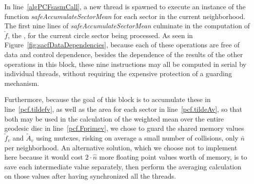 In line~\ref{algPCFsasmCall}, a new thread is spawned to execute an instance of the function \textit{safeAccumulateSectorMean} for each sector in the current neighborhood. The first nine lines of \textit{safeAccumulateSectorMean} culminate in the computation of $\check{f}$, the \wmfv{}, for the current circle sector being processed. As seen in Figure~\ref{fig:sacfDataDependencies}, because each of these operations are free of data and control dependence, besides the dependence of the results of the other operations in this block, these nine instructions may all be computed in serial by individual threads, without requiring the expensive protection of a guarding mechanism.

Furthermore, because the goal of this block is to accumulate these  in line~\ref{pcf.tildefv}, as well as the area for each sector in line~\ref{pcf.tildeAv}, so that both may be used in the calculation of the weighted mean over the entire geodesic disc in line~\ref{pcf.Fprimev}, we chose to guard the shared memory values $\tilde{f}_v$ and $\tilde{A}_v$ using mutexes, risking on average a small number of collisions, only $\bar{n}$ per neighborhood. An alternative solution, which we choose not to implement here because it would cost $2\cdot\hat{n}$ more floating point values worth of memory, is to save each intermediate value separately, then perform the averaging calculation on those values after having synchronized all the threads.

